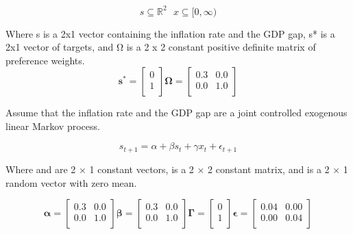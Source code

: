 \documentclass[a4paper,oneside]{article}
\begin{document}
\begin{equation*}
s \subseteq \mathbb{R}^{2} \:\:\:	
x \subseteq [0, \infty)
\end{equation*}

Where s is a 2x1 vector containing the inflation rate and the GDP gap, s* is a 2x1 vector of targets, and Ω is a 2 x 2 constant positive definite matrix of preference weights. 
\begin{equation*} %
	\bm{s^{*}} = 
		\left.
			\begin{bmatrix}
				0	\\
				1	\\
			\end{bmatrix}
		\right.
	\bm{\Omega} = 
		\left.
			\begin{bmatrix}
				0.3	&	0.0\\
				0.0	&	1.0\\
			\end{bmatrix}
		\right.
\end{equation*}

Assume that the inflation rate and the GDP gap are a joint controlled exogenous linear Markov process.

\begin{equation}
	s_{t+1}= \alpha+\beta s_{t}+\gamma x_{t}+\epsilon_{t+1} 
	\label{eq:mye3}
\end{equation}

Where \textalpha \: and \textGamma \: are 2 × 1 constant vectors, \textbeta \: is a 2 × 2 constant matrix, and \textepsilon \: is a 2 × 1 random vector with zero mean. 

\begin{equation*}
	\bm{\alpha} =
		\left.
			\begin{bmatrix}
				0.3	&	0.0\\
				0.0	&	1.0\\
			\end{bmatrix} 
		\right.
	\bm{\beta} =      
		\left.
			\begin{bmatrix}
				0.3	&	0.0\\
				0.0	&	1.0\\
			\end{bmatrix} 
		\right.
	\bm{\Gamma} =
		\left.
			\begin{bmatrix}
				0	\\
				1	\\
			\end{bmatrix}
		\right.
	\bm{\epsilon} = 
		\left.
			\begin{bmatrix}
				0.04 &	0.00\\
				0.00 &	0.04\\
			\end{bmatrix}
		\right.
\end{equation*}
\end{document}
